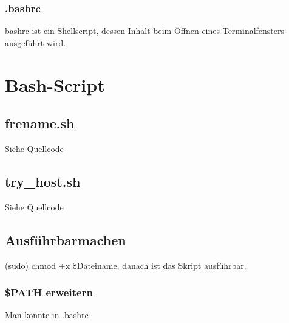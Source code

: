 \documentclass[]{article}
\begin{document}
\subsubsection{.bashrc}
bashrc ist ein Shellscript, dessen Inhalt beim Öffnen eines Terminalfensters ausgeführt wird.

\section{Bash-Script}
\subsection{frename.sh}
Siehe Quellcode

\subsection{try_host.sh}
Siehe Quellcode

\subsection{Ausführbarmachen}
(sudo) chmod +x \$Dateiname, danach ist das Skript ausführbar.

\subsubsection{\$PATH erweitern}
Man könnte in .bashrc 
\end{document}
